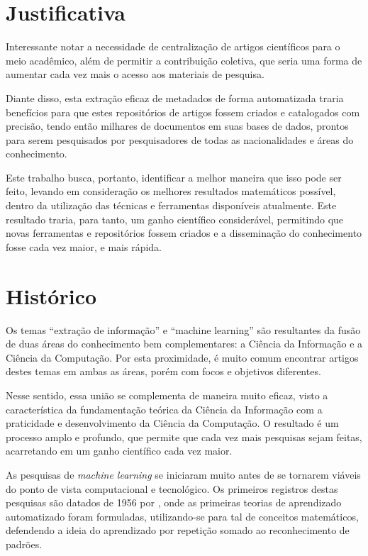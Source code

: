 \section{Justificativa}
\label{sec:justification}

Interessante notar a necessidade de centralização de artigos científicos para o meio acadêmico, além de permitir a contribuição coletiva, que seria uma forma de aumentar cada vez mais o acesso aos materiais de pesquisa. 

Diante disso, esta extração eficaz de metadados de forma automatizada traria benefícios para que estes repositórios de artigos fossem criados e catalogados com precisão, tendo então milhares de documentos em suas bases de dados, prontos para serem pesquisados por pesquisadores de todas as nacionalidades e áreas do conhecimento.

Este trabalho busca, portanto, identificar a melhor maneira que isso pode ser feito, levando em consideração os melhores resultados matemáticos possível, dentro da utilização das técnicas e ferramentas disponíveis atualmente. Este resultado traria, para tanto, um ganho científico considerável, permitindo que novas ferramentas e repositórios fossem criados e a disseminação do conhecimento fosse cada vez maior, e mais rápida.

\section{Histórico}
\label{sec:history}

Os temas ``extração de informação'' e ``machine learning'' são resultantes da fusão de duas áreas do conhecimento bem complementares: a Ciência da Informação e a Ciência da Computação. Por esta proximidade, é muito comum encontrar artigos destes temas em ambas as áreas, porém com focos e objetivos diferentes.

Nesse sentido, essa união se complementa de maneira muito eficaz, visto a característica da fundamentação teórica da Ciência da Informação com a praticidade e desenvolvimento da Ciência da Computação. O resultado é um processo amplo e profundo, que permite que cada vez mais pesquisas sejam feitas, acarretando em um ganho científico cada vez maior.

As pesquisas de \textit{machine learning} se iniciaram muito antes de se tornarem viáveis do ponto de vista computacional e tecnológico. Os primeiros registros destas pesquisas são datados de 1956 por \cite{machine-learning}, onde as primeiras teorias de aprendizado automatizado foram formuladas, utilizando-se para tal de conceitos matemáticos, defendendo a ideia do aprendizado por repetição somado ao reconhecimento de padrões.

